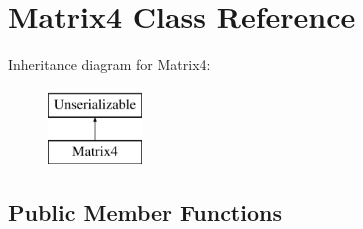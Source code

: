 \hypertarget{class_matrix4}{\section{\-Matrix4 \-Class \-Reference}
\label{class_matrix4}
}
\-Inheritance diagram for \-Matrix4\-:\begin{figure}[H]
\begin{center}
\leavevmode
\includegraphics[height=2.000000cm]{class_matrix4}
\end{center}
\end{figure}
\subsection*{\-Public \-Member \-Functions}
